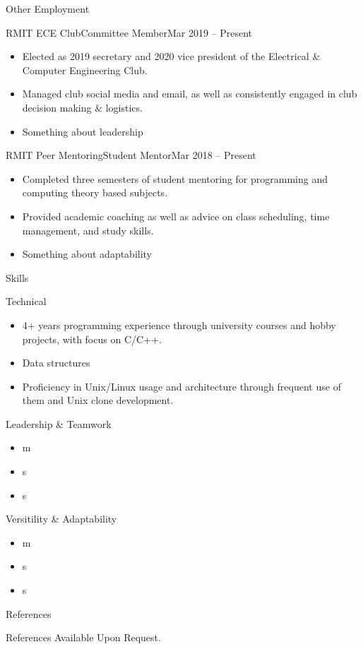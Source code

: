 \documentclass[]{mcdowellcv}
\begin{document}
	\begin{cvsection}{Other Employment}
		\begin{cvsubsection}{RMIT ECE Club}{Committee Member}{Mar 2019 -- Present}
			\begin{itemize}
				\item Elected as 2019 secretary and 2020 vice president of the Electrical \& Computer Engineering Club.
				\item Managed club social media and email, as well as consistently engaged in club decision making \& logistics.
				\item Something about leadership
			\end{itemize}
		\end{cvsubsection}

		\begin{cvsubsection}{RMIT Peer Mentoring}{Student Mentor}{Mar 2018 -- Present}
			\begin{itemize}
				\item Completed three semesters of student mentoring for programming and computing theory based subjects.
				\item Provided academic coaching as well as advice on class scheduling, time management, and study skills.
				\item Something about adaptability
			\end{itemize}
		\end{cvsubsection}
	\end{cvsection}

	\begin{cvsection}{Skills}
		\begin{cvsubsection}{Technical}{}{}
			\begin{itemize}
				\item 4+ years programming experience through university courses and hobby projects, with focus on C/C++.
				\item Data structures
				\item Proficiency in Unix/Linux usage and architecture through frequent use of them and Unix clone development.
			\end{itemize}
		\end{cvsubsection}
		\begin{cvsubsection}{Leadership \& Teamwork}{}{}
			\begin{itemize}
				\item m
				\item s
				\item s
			\end{itemize}
		\end{cvsubsection}
		\begin{cvsubsection}{Versitility \& Adaptability}{}{}
			\begin{itemize}
				\item m
				\item s
				\item s
			\end{itemize}
		\end{cvsubsection}
	\end{cvsection}

	\begin{cvsection}{References}
		\begin{cvsubsection}{}{}{}
			References Available Upon Request.
		\end{cvsubsection}
	\end{cvsection}
\end{document}
